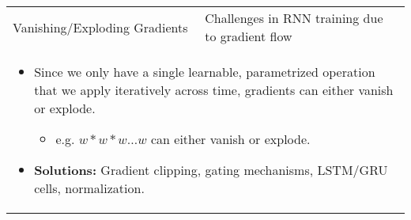 \begin{summary}
\begin{center}
\begin{tabular}{ll}
            \midrule 
            Vanishing/Exploding Gradients & Challenges in RNN training due to gradient flow \\ 
            \multicolumn{2}{p{\linewidth}}{
            \begin{itemize}
                \item Since we only have a single learnable, parametrized operation that we apply iteratively across time, gradients can either vanish or explode.
                \begin{itemize}
                    \item e.g. $w*w*w \ldots w$ can either vanish or explode.
                \end{itemize}
                \item \textbf{Solutions:} Gradient clipping, gating mechanisms, LSTM/GRU cells, normalization. 
            \end{itemize}} \\
            \bottomrule
        \end{tabular}
    \end{center}
\end{summary}

